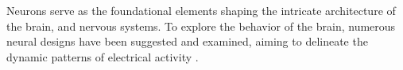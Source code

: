 \documentclass[class={myRUCProject}, crop=false]{standalone}
\begin{document}


Neurons serve as the foundational elements shaping the intricate architecture of the brain, and nervous systems. To explore the behavior of the brain, numerous neural designs have been suggested and examined, aiming to delineate the dynamic patterns of electrical activity \cite{njitacke2020hidden}.
\end{document}
